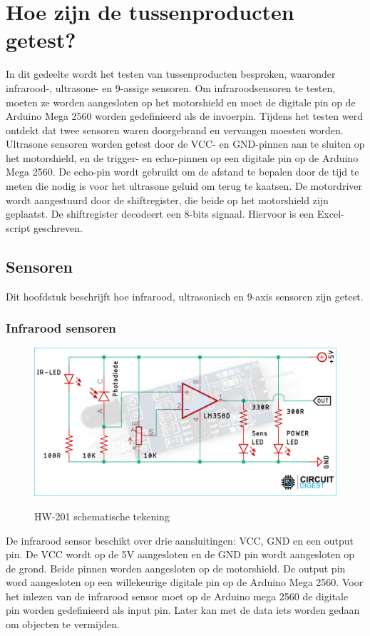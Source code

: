 \section{Hoe zijn de tussenproducten getest?}
In dit gedeelte wordt het testen van tussenproducten besproken, waaronder infrarood\cite{IR-datasheet}-, ultrasone- en 9-assige\cite{AXIS} sensoren. Om infraroodsensoren\cite{IR-datasheet} te testen, moeten ze worden aangesloten op het \gls{motorshield} en moet de digitale pin op de Arduino Mega 2560\cite{ArduinoMEGA} worden gedefinieerd als de invoerpin. Tijdens het testen werd ontdekt dat twee sensoren waren doorgebrand en vervangen moesten worden. Ultrasone sensoren worden getest door de VCC- en GND-pinnen aan te sluiten op het \gls{motorshield}, en de trigger- en echo-pinnen op een digitale pin op de Arduino Mega 2560\cite{ArduinoMEGA}. De echo-pin wordt gebruikt om de afstand te bepalen door de tijd te meten die nodig is voor het ultrasone geluid om terug te kaatsen. De motordriver\cite{h-brug} wordt aangestuurd door de shiftregister\cite{shiftregister}, die beide op het \gls{motorshield} zijn geplaatst. De shiftregister\cite{shiftregister} decodeert een 8-bits signaal. Hiervoor is een Excel-script geschreven.
\subsection{Sensoren}
Dit hoofdstuk beschrijft hoe infrarood, ultrasonisch en 9-axis sensoren zijn getest.
\subsubsection{Infrarood sensoren}
\begin{figure}[h]
    \centering
    \includegraphics[scale = 0.3]{Media/Figuren/Arduino-IR-Sensor-Circuit.jpg}
    \caption{HW-201 schematische tekening}
    \cite{HW-201-schema}
    \label{schematic-HW-201}   
    \end{figure}
De infrarood sensor beschikt over drie aansluitingen: VCC, GND en een output pin. De VCC wordt op de 5V aangesloten en de GND pin wordt aangesloten op de grond. Beide pinnen worden aangesloten op de motorshield. De output pin word aangesloten op een willekeurige digitale pin op de Arduino Mega 2560. Voor het inlezen van de infrarood sensor moet op de Arduino mega 2560 de digitale pin worden gedefinieerd als input pin. Later kan met de data iets worden gedaan om objecten te vermijden.

